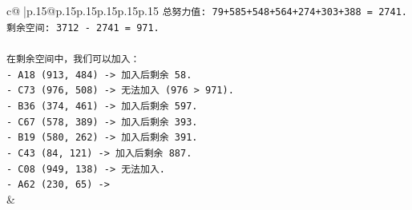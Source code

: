 \documentclass{article}
\begin{document}
{\begin{supertabular}{c@{$\;$}|p{.15\linewidth}@{}p{.15\linewidth}p{.15\linewidth}p{.15\linewidth}p{.15\linewidth}p{.15\linewidth}}
{{{\texttt{总努力值: 79+585+548+564+274+303+388 = 2741.} \\
\texttt{剩余空间: 3712 {-} 2741 = 971.} \\
\\ 
\texttt{在剩余空间中，我们可以加入：} \\
\texttt{{-} A18 (913, 484) {-}> 加入后剩余 58.} \\
\texttt{{-} C73 (976, 508) {-}> 无法加入 (976 > 971).} \\
\texttt{{-} B36 (374, 461) {-}> 加入后剩余 597.} \\
\texttt{{-} C67 (578, 389) {-}> 加入后剩余 393.} \\
\texttt{{-} B19 (580, 262) {-}> 加入后剩余 391.} \\
\texttt{{-} C43 (84, 121) {-}> 加入后剩余 887.} \\
\texttt{{-} C08 (949, 138) {-}> 无法加入.} \\
\texttt{{-} A62 (230, 65) {-}>} \\
            }
        }
    }
    & \\ \\


\end{supertabular}}
\end{document}
